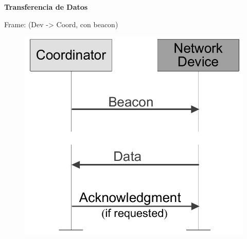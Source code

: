 \documentclass[aspectratio=169]{beamer}
\begin{document}
\begin{frame}{\textbf{Transferencia de Datos}}

Frame: (Dev -> Coord, con beacon)
\vspace{10px}

\begin{figure}[H]
			\includegraphics[height=.8\textheight]{./imagenes/dev-coord-beacon.jpg}
		\end{figure}	 
\end{frame}
\end{document}
